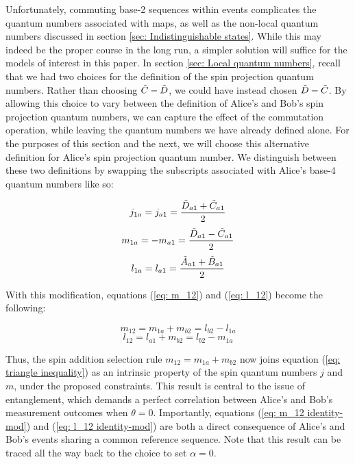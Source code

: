 \documentclass{article}
\begin{document}
Unfortunately, commuting base-2 sequences within events complicates the quantum numbers associated with maps, as well as the non-local quantum numbers discussed in section \ref{sec: Indistinguishable states}. While this may indeed be the proper course in the long run, a simpler solution will suffice for the models of interest in this paper. In section \ref{sec: Local quantum numbers}, recall that we had two choices for the definition of the spin projection quantum numbers. Rather than choosing $\Tilde{C}-\tilde{D}$, we could have instead chosen $\Tilde{D}-\tilde{C}$. By allowing this choice to vary between the definition of Alice's and Bob's spin projection quantum numbers, we can capture the effect of the commutation operation, while leaving the quantum numbers we have already defined alone. For the purposes of this section and the next, we will choose this alternative definition for Alice's spin projection quantum number. We distinguish between these two definitions by swapping the subscripts associated with Alice's base-4 quantum numbers like so:

\begin{equation}
    j_{1a}=j_{a1}=\frac{\Tilde{D}_{a1}+\Tilde{C}_{a1}}{2}
\end{equation}
\begin{equation}
    m_{1a}=-m_{a1}=\frac{\Tilde{D}_{a1}-\Tilde{C}_{a1}}{2}
\end{equation}
\begin{equation}
    l_{1a}=l_{a1}=\frac{\Tilde{A}_{a1}+\Tilde{B}_{a1}}{2}
\end{equation}

With this modification, equations (\ref{eq: m_12}) and (\ref{eq: l_12}) become the following:

\begin{equation}
m_{12}=m_{1a}+m_{b2}=l_{b2}-l_{1a}\label{eq: m_12 identity-mod}
\end{equation}
\begin{equation}
l_{12}=l_{a1}+m_{b2}=l_{b2}-m_{1a}\label{eq: l_12 identity-mod}
\end{equation}

Thus, the spin addition selection rule $m_{12}=m_{1a}+m_{b2}$ now joins equation (\ref{eq: triangle inequality}) as an intrinsic property of the spin quantum numbers $j$ and $m$, under the proposed constraints. This result is central to the issue of entanglement, which demands a perfect correlation between Alice's and Bob's measurement outcomes when $\theta=0$. Importantly, equations (\ref{eq: m_12 identity-mod}) and (\ref{eq: l_12 identity-mod}) are both a direct consequence of Alice's and Bob's events sharing a common reference sequence. Note that this result can be traced all the way back to the choice to set $\alpha=0$.  
\end{document}
